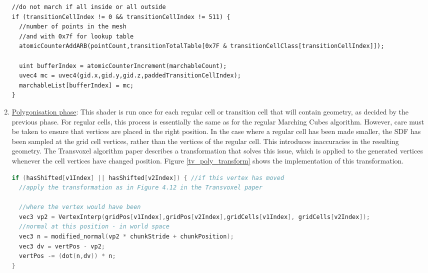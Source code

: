 \documentclass{article}
\begin{document}
\begin{enumerate}
\begin{lstlisting}
//do not march if all inside or all outside
if (transitionCellIndex != 0 && transitionCellIndex != 511) {
  //number of points in the mesh
  //and with 0x7f for lookup table
  atomicCounterAddARB(pointCount,transitionTotalTable[0x7F & transitionCellClass[transitionCellIndex]]);

  uint bufferIndex = atomicCounterIncrement(marchableCount);
  uvec4 mc = uvec4(gid.x,gid.y,gid.z,paddedTransitionCellIndex);
  marchableList[bufferIndex] = mc;
}
\end{lstlisting}

\item \underline{Polygonisation phase}: This shader is run once for each regular cell or transition cell that will contain geometry, as decided by the previous phase. For regular cells, this process is essentially the same as for the regular Marching Cubes algorithm. However, care must be taken to ensure that vertices are placed in the right position. In the case where a regular cell has been made smaller, the SDF has been sampled at the grid cell vertices, rather than the vertices of the regular cell. This introduces inaccuracies in the resulting geometry. The Transvoxel algorithm paper describes a transformation that solves this issue, which is applied to the generated vertices whenever the cell vertices have changed position. Figure \ref{tv_poly_transform} shows the implementation of this transformation.

\begin{lstlisting}[language=C++,label={tv_poly_transform},caption={Transformation to be applied to a generated vertex, when the cell vertices it is being generated between have moved.}]
if (hasShifted[v1Index] || hasShifted[v2Index]) { //if this vertex has moved
  //apply the transformation as in Figure 4.12 in the Transvoxel paper

  //where the vertex would have been
  vec3 vp2 = VertexInterp(gridPos[v1Index],gridPos[v2Index],gridCells[v1Index], gridCells[v2Index]);
  //normal at this position - in world space
  vec3 n = modified_normal(vp2 * chunkStride + chunkPosition);
  vec3 dv = vertPos - vp2;
  vertPos -= (dot(n,dv)) * n;
}
\end{lstlisting}


\end{enumerate}
\end{document}
